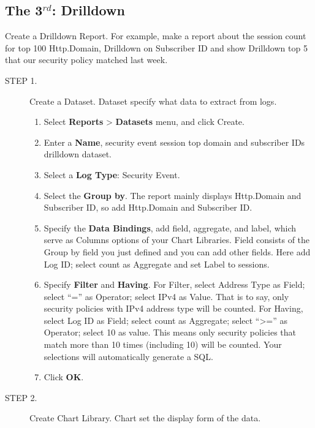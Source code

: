 \subsection*{\hypertarget{link:The 3rd: Drilldown}{The 3$^{rd}$: Drilldown}}
\label{sec:appendix_f:report:drilldown}

Create a Drilldown Report. For example, make a report about the session count for top 100 Http.Domain, Drilldown on Subscriber ID and show Drilldown top 5 that our security policy matched last week.

\begin{description}
    \item[STEP 1.]	Create a Dataset. Dataset specify what data to extract from logs.
    \begin{enumerate}
        \item Select \textbf{Reports} > \textbf{Datasets} menu, and click Create.
        \item Enter a \textbf{Name}, security event session top domain and subscriber IDs drilldown dataset.
        \item Select a \textbf{Log Type}: Security Event.
        \item Select the \textbf{Group by}. The report mainly displays Http.Domain and Subscriber ID, so add Http.Domain and Subscriber ID.
        \item Specify the \textbf{Data Bindings}, add field, aggregate, and label, which serve as Columns options of your Chart Libraries. Field consists of the Group by field you just defined and you can add other fields. Here add Log ID; select count as Aggregate and set Label to sessions.
        \item Specify \textbf{Filter} and \textbf{Having}. For Filter, select Address Type as Field; select “=” as Operator; select IPv4 as Value. That is to say, only security policies with IPv4 address type will be counted. For Having, select Log ID as Field; select count as Aggregate; select “>=” as Operator; select 10 as value. This means only security policies that match more than 10 times (including 10) will be counted. Your selections will automatically generate a SQL.
        \item Click \textbf{OK}.
    \end{enumerate}
    \item[STEP 2.]	Create Chart Library. Chart set the display form of the data.
    \begin{enumerate}

\end{enumerate}
\end{description}
